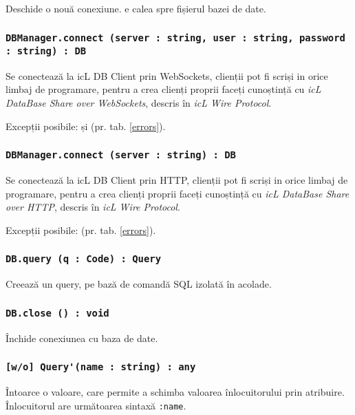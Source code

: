 Deschide o nouă conexiune.  e calea spre fișierul bazei de date.

\subsubsection{\lstinline|DBManager.connect (server : string, user : string, password : string) : DB|}

Se conectează la icL DB Client prin WebSockets, clienții pot fi scriși in orice limbaj de programare, pentru a crea clienți proprii faceți cunoștință cu \textit{icL DataBase Share over WebSockets}, descris în \textit{icL Wire Protocol}.

Excepții posibile:  și  (pr. tab. \ref{errors}).

\subsubsection{\lstinline|DBManager.connect (server : string) : DB|}

Se conectează la icL DB Client prin HTTP, clienții pot fi scriși in orice limbaj de programare, pentru a crea clienți proprii faceți cunoștință cu \textit{icL DataBase Share over HTTP}, descris în \textit{icL Wire Protocol}.

Excepții posibile:  (pr. tab. \ref{errors}).

\subsubsection{\lstinline|DB.query (q : Code) : Query|}

Creează un query, pe bază de comandă SQL izolată în acolade.

\subsubsection{\lstinline|DB.close () : void|}

Închide conexiunea cu baza de date.

\subsubsection{\lstinline|[w/o] Query'(name : string) : any|}

Întoarce o valoare, care permite a schimba valoarea înlocuitorului prin atribuire. Înlocuitorul are următoarea sintaxă \lstinline|:name|.

